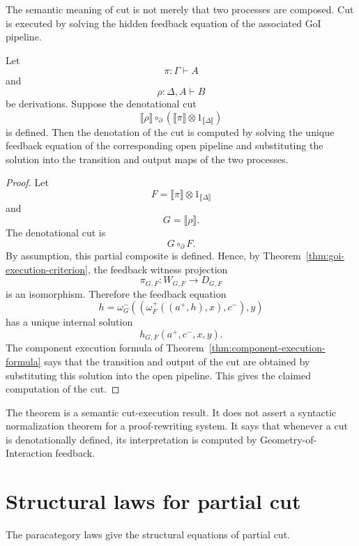 The semantic meaning of cut is not merely that two processes are composed.
Cut is executed by solving the hidden feedback equation of the associated GoI
pipeline.

\begin{theorem}
\label{thm:cut-execution}
Let
\[
\pi:\Gamma\vdash A
\]
and
\[
\rho:\Delta,A\vdash B
\]
be derivations.  Suppose the denotational cut
\[
\llbracket\rho\rrbracket
\circ_{\partial}
(\llbracket\pi\rrbracket\otimes 1_{\llbracket\Delta\rrbracket})
\]
is defined.  Then the denotation of the cut is computed by solving the unique
feedback equation of the corresponding open pipeline and substituting the
solution into the transition and output maps of the two processes.
\end{theorem}

\begin{proof}
Let
\[
F=
\llbracket\pi\rrbracket\otimes 1_{\llbracket\Delta\rrbracket}
\]
and
\[
G=
\llbracket\rho\rrbracket.
\]
The denotational cut is
\[
G\circ_{\partial}F.
\]
By assumption, this partial composite is defined.  Hence, by
Theorem~\ref{thm:goi-execution-criterion}, the feedback witness projection
\[
\pi_{G,F}:W_{G,F}\to D_{G,F}
\]
is an isomorphism.  Therefore the feedback equation
\[
h
=
\omega_G^-
\left(
\left(
\omega_F^+((a^+,h),x),
c^-
\right),
y
\right)
\]
has a unique internal solution
\[
h_{G,F}(a^+,c^-,x,y).
\]
The component execution formula of
Theorem~\ref{thm:component-execution-formula} says that the transition and
output of the cut are obtained by substituting this solution into the open
pipeline.  This gives the claimed computation of the cut.
\end{proof}

\begin{remark}
\label{rem:semantic-cut-execution}
The theorem is a semantic cut-execution result.  It does not assert a
syntactic normalization theorem for a proof-rewriting system.  It says that
whenever a cut is denotationally defined, its interpretation is computed by
Geometry-of-Interaction feedback.
\end{remark}

\section{Structural laws for partial cut}
\label{sec:structural-laws-partial-cut}

The paracategory laws give the structural equations of partial cut.

